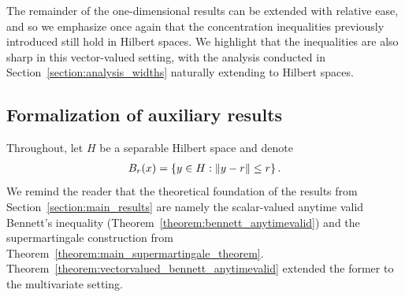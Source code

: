 The remainder of the one-dimensional results can be extended with relative ease, and so we emphasize once again that the concentration inequalities previously introduced still hold in Hilbert spaces.  We highlight that the inequalities are also sharp in this vector-valued setting, with the analysis conducted in Section~\ref{section:analysis_widths} naturally extending to Hilbert spaces. %



\subsection{Formalization of auxiliary results}

Throughout, let $H$ be a separable Hilbert space and denote 
\begin{align*}
    B_r(x) = \left\{ y\in H : \|y-r\| \leq r \right\}.
\end{align*}
We remind the reader that the theoretical foundation of the results from Section~\ref{section:main_results} are namely the scalar-valued anytime valid Bennett's inequality (Theorem~\ref{theorem:bennett_anytimevalid}) and the supermartingale construction from Theorem~\ref{theorem:main_supermartingale_theorem}. Theorem~\ref{theorem:vectorvalued_bennett_anytimevalid} extended the former to the multivariate setting.
